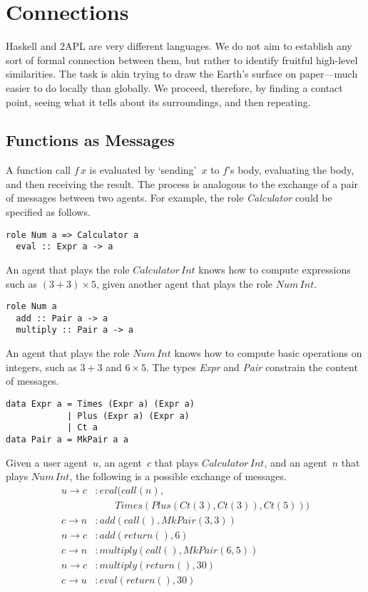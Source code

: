 \documentclass[conference,compsoc]{IEEEtran} %
\begin{document}
\section{Connections} %

Haskell and 2APL are very different languages. We do not aim to establish
any sort of formal connection between them, but rather to identify fruitful
high-level similarities. The task is akin trying to draw the Earth's
surface on paper---much easier to do locally than globally. We proceed,
therefore, by finding a contact point, seeing what it tells about its
surroundings, and then repeating.

\subsection{Functions as Messages} %

A function call $f\,x$ is evaluated by `sending'~$x$ to $f$'s body,
evaluating the body, and then receiving the result. The process is
analogous to the exchange of a pair of messages between two agents. For
example, the role \textit{Calculator} could be specified as follows.
\begin{lstlisting}[style=me]
role Num a => Calculator a
  eval :: Expr a -> a
\end{lstlisting}
An agent that plays the role $\mathit{Calculator}\,\mathit{Int}$ knows
how to compute expressions such as $(3+3)\times5$, given another agent
that plays the role $\mathit{Num}\,\mathit{Int}$.
\begin{lstlisting}[style=me]
role Num a
  add :: Pair a -> a
  multiply :: Pair a -> a
\end{lstlisting}
An agent that plays the role $\mathit{Num}\,\mathit{Int}$ knows how to
compute basic operations on integers, such as $3+3$ and $6\times5$. The
types \textit{Expr} and \textit{Pair} constrain the content of messages.
\begin{lstlisting}[style=hs]
data Expr a = Times (Expr a) (Expr a) 
            | Plus (Expr a) (Expr a) 
            | Ct a
data Pair a = MkPair a a
\end{lstlisting}
Given a user agent~$u$, an agent~$c$ that plays
$\mathit{Calculator}\,\mathit{Int}$, and an agent~$n$ that plays
$\mathit{Num}\,\mathit{Int}$, the following is a possible exchange of
messages.
\begin{align*}
u\to c &: 
  \mathit{eval}(\mathit{call}(n),\\
  &\qquad\mathit{Times}(
    \mathit{Plus}(\mathit{Ct}(3),\mathit{Ct}(3)),\mathit{Ct}(5)))\\
c\to n &: \mathit{add}(\mathit{call}(), \mathit{MkPair}(3, 3))\\
n\to c &: \mathit{add}(\mathit{return}(), 6)\\
c\to n &: \mathit{multiply}(\mathit{call}(), \mathit{MkPair}(6, 5))\\
n\to c &: \mathit{multiply}(\mathit{return}(), 30)\\
c\to u &: \mathit{eval}(\mathit{return}(), 30)
\end{align*}
\end{document}
